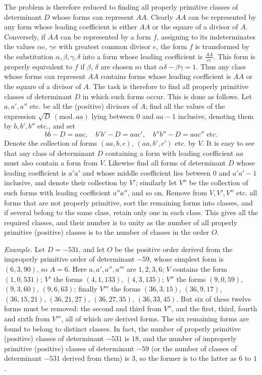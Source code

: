 The problem is therefore reduced to finding all properly primitive classes of determinant \(D\) whose forms can represent \(AA\). Clearly \(AA\) can be represented by any form whose leading coefficient is either \(AA\) or the square of a divisor of \(A\). Conversely, if \(AA\) can be represented by a form \(f\), assigning to its indeterminates the values \(\alpha e\), \(\gamma e\) with greatest common divisor \(e\), the form \(f\) is transformed by the substitution \(\alpha,\beta,\gamma,\delta\) into a form whose leading coefficient is \(\frac{AA}{ee}\). This form is properly equivalent to \(f\) if \(\beta\), \(\delta\) are chosen so that \(\alpha\delta-\beta\gamma=1\). Thus any class whose forms can represent \(AA\) contains forms whose leading coefficient is \(AA\) or the square of a divisor of \(A\). The task is therefore to find all properly primitive classes of determinant \(D\) in which such forms occur. This is done as follows. Let \(a,a',a''\) etc. be all the (positive) divisors of \(A\); find all the values of the expression \(\surd D\ (\mathrm{mod.}\,aa)\) lying between \(0\) and \(aa-1\) inclusive, denoting them by \(b,b',b''\) etc., and set
\[
bb-D=aac,\quad b'b'-D=aac',\quad b''b''-D=aac''\text{ etc.}
\]
Denote the collection of forms \((aa,b,c)\), \((aa,b',c')\) etc. by \(V\). It is easy to see that any class of determinant \(D\) containing a form with leading coefficient \(aa\) must also contain a form from \(V\). Likewise find all forms of determinant \(D\) whose leading coefficient is \(a'a'\) and whose middle coefficient lies between \(0\) and \(a'a'-1\) inclusive, and denote their collection by \(V'\); similarly let \(V''\)
be the collection of such forms with leading coefficient \(a''a''\), and so on. Remove from \(V,V',V''\) etc. all forms that are not properly primitive, sort the remaining forms into classes, and if several belong to the same class, retain only one in each class. This gives all the required classes, and their number is to unity as the number of all properly primitive (positive) classes is to the number of classes in the order \(O\).

\textit{Example.} Let \(D=-531\), and let \(O\) be the positive order derived from the improperly primitive order of determinant \(-59\), whose simplest form is \((6,3,90)\), so \(A=6\). Here \(a,a',a'',a'''\) are \(1,2,3,6\); \(V\) contains the form \((1,0,531)\); \(V'\) the forms \((4,1,133)\), \((4,3,135)\); \(V''\) the forms \((9,0,59)\), \((9,3,60)\), \((9,6,63)\); finally \(V'''\) the forms \((36,3,15)\), \((36,9,17)\), \((36,15,21)\), \((36,21,27)\), \((36,27,35)\), \((36,33,45)\). But six of these twelve forms must be removed: the second and third from \(V''\), and the first, third, fourth and sixth from \(V'''\), all of which are derived forms. The six remaining forms are found to belong to distinct classes. In fact, the number of properly primitive (positive) classes of determinant \(-531\) is \(18\), and the number of improperly primitive (positive) classes of determinant \(-59\) (or the number of classes of determinant \(-531\) derived from them) is \(3\), so the former is to the latter as \(6\) to \(1\).

